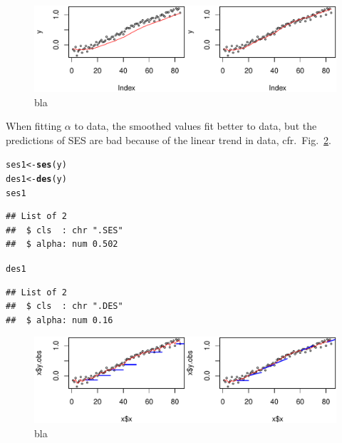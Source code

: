 \documentclass[10pt]{article}\usepackage[]{graphicx}\usepackage[]{color}
\makeatletter
\def\maxwidth{ %
  \ifdim\Gin@nat@width>\linewidth
    \linewidth
  \else
    \Gin@nat@width
  \fi
}
\newcommand{\hlstd}[1]{\textcolor[rgb]{0.345,0.345,0.345}{#1}}%
\newcommand{\hlkwb}[1]{\textcolor[rgb]{0.69,0.353,0.396}{#1}}%
\newcommand{\hlkwd}[1]{\textcolor[rgb]{0.737,0.353,0.396}{\textbf{#1}}}%
\newenvironment{kframe}{%
 \def\at@end@of@kframe{}%
 \ifinner\ifhmode%
  \def\at@end@of@kframe{\end{minipage}}%
  \begin{minipage}{\columnwidth}%
 \fi\fi%
 \def\FrameCommand##1{\hskip\@totalleftmargin \hskip-\fboxsep
 \colorbox{shadecolor}{##1}\hskip-\fboxsep
     \hskip-\linewidth \hskip-\@totalleftmargin \hskip\columnwidth}%
 \MakeFramed {\advance\hsize-\width
   \@totalleftmargin\z@ \linewidth\hsize
   \@setminipage}}%
 {\par\unskip\endMakeFramed%
 \at@end@of@kframe}
\newenvironment{knitrout}{}{} %
\makeatother
\begin{document}
\begin{knitrout}
\color{fgcolor}\begin{figure}
\includegraphics[width=\maxwidth]{fig/graphfig01-1} \caption[bla]{bla}\label{fig:fig01}
\end{figure}


\end{knitrout}

When fitting $\alpha$ to data, the smoothed values fit better to data,
but the predictions of SES are bad because of the linear trend in
data, cfr.\ Fig.~\ref{fig:fig02}.

\begin{knitrout}
\color{fgcolor}\begin{kframe}
\begin{alltt}
\hlstd{ses1} \hlkwb{<-} \hlkwd{ses}\hlstd{(y)}
\hlstd{des1} \hlkwb{<-} \hlkwd{des}\hlstd{(y)}
\hlstd{ses1}
\end{alltt}
\begin{verbatim}
## List of 2
##  $ cls  : chr ".SES"
##  $ alpha: num 0.502
\end{verbatim}
\begin{alltt}
\hlstd{des1}
\end{alltt}
\begin{verbatim}
## List of 2
##  $ cls  : chr ".DES"
##  $ alpha: num 0.16
\end{verbatim}
\end{kframe}
\end{knitrout}

\begin{knitrout}
\color{fgcolor}\begin{figure}
\includegraphics[width=\maxwidth]{fig/graphfig02-1} \caption[bla]{bla}\label{fig:fig02}
\end{figure}


\end{knitrout}






\end{document}
